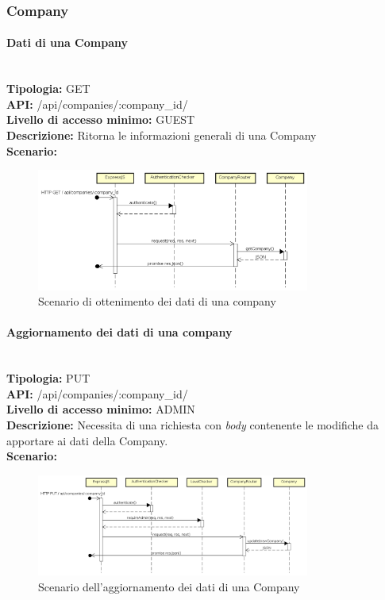 \newpage
\subsubsection{Company}
\paragraph{Dati di una Company}\mbox{}\\
\textbf{Tipologia:} GET \\
\textbf{API:} /api/companies/:company\_id/ \\
\textbf{Livello di accesso minimo:} GUEST \\
\textbf{Descrizione:} Ritorna le informazioni generali di una Company \\
\textbf{Scenario:} 
\begin{figure}[H]
\centering
\includegraphics[width=0.8\textwidth]{res/sections/backend/sequence/(GET)company.png}
\caption{Scenario di ottenimento dei dati di una company}
\end{figure}

\newpage
\paragraph{Aggiornamento dei dati di una company}\mbox{}\\
\textbf{Tipologia:} PUT \\
\textbf{API:} /api/companies/:company\_id/ \\
\textbf{Livello di accesso minimo:} ADMIN \\
\textbf{Descrizione:} Necessita di una richiesta con \textit{body} contenente le modifiche da apportare ai dati della Company. \\
\textbf{Scenario:} 
\begin{figure}[H]
\centering
\includegraphics[width=0.8\textwidth]{res/sections/backend/sequence/(PUT)company.png}
\caption{Scenario dell'aggiornamento dei dati di una Company}
\end{figure}

